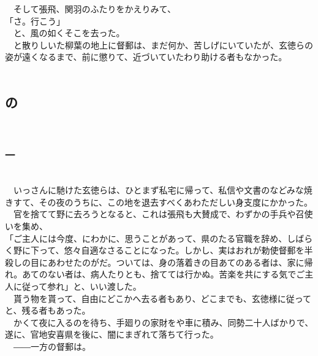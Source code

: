 \documentclass[
  paper=a5,
  fontsize=10pt,
  jafontsize=9.5pt,
  tate,                  %
  open_bracket_pos=nibu, %
]{jlreq}
\begin{document}
　そして張飛、関羽のふたりをかえりみて、\\


「さ。行こう」\\


　と、風の如くそこを去った。\\


　と散りしいた柳葉の地上に督郵は、まだ何か、苦しげにいていたが、玄徳らの姿が遠くなるまで、前に懲りて、近づいていたわり助ける者もなかった。\\

\\

\subsection{の}

\\

\subsubsection{一}

\\


　いっさんに馳けた玄徳らは、ひとまず私宅に帰って、私信や文書のなどみな焼きすて、その夜のうちに、この地を退去すべくあわただしい身支度にかかった。\\


　官を捨てて野に去ろうとなると、これは張飛も大賛成で、わずかの手兵や召使いを集め、\\


「ご主人には今度、にわかに、思うことがあって、県のたる官職を辞め、しばらく野に下って、悠々自適なさることになった。しかし、実はおれが勅使督郵を半殺しの目にあわせたのがだ。ついては、身の落着きの目あてのある者は、家に帰れ。あてのない者は、病人たりとも、捨てては行かぬ。苦楽を共にする気でご主人に従って参れ」と、いい渡した。\\


　貰う物を貰って、自由にどこかへ去る者もあり、どこまでも、玄徳様に従ってと、残る者もあった。\\


　かくて夜に入るのを待ち、手廻りの家財をや車に積み、同勢二十人ばかりで、遂に、官地安喜県を後に、闇にまぎれて落ちて行った。\\


　――一方の督郵は。\\
\end{document}
